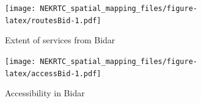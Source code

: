 \documentclass[
]{book}
\begin{document}
\begin{figure}
\centering
\texttt{[image: NEKRTC\_spatial\_mapping\_files/figure-latex/routesBid-1.pdf]}
\caption{\label{fig:routesBid}Extent of services from Bidar}
\end{figure}

\begin{figure}
\centering
\texttt{[image: NEKRTC\_spatial\_mapping\_files/figure-latex/accessBid-1.pdf]}
\caption{\label{fig:accessBid}Accessibility in Bidar}
\end{figure}

  
\end{document}
